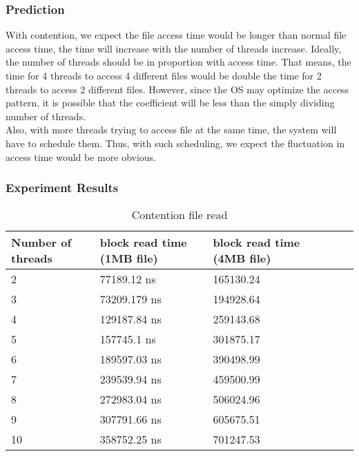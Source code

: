 \documentclass{article} %
\begin{document}
\subsubsection{Prediction}
With contention, we expect the file access time would be longer than normal file access time, the time will increase with the number of threads increase. Ideally, the number of threads should be in proportion with access time. That means, the time for 4 threads to access 4 different files would be double the time for 2 threads to access 2 different files. However, since the OS may optimize the access pattern, it is possible that the coefficient will be less than the simply dividing number of threads. \\
Also, with more threads trying to access file at the same time, the system will have to schedule them. Thus, with such scheduling, we expect the fluctuation in access time would be more obvious.\\

\subsubsection{Experiment Results}
\begin{table}[!htbp]
  \caption{Contention file read}
  \begin{tabular}{|l|l|l|l|l|l|}
    \hline
    Number of threads & block read time (1MB file) & block read time (4MB file) \\ \hline
    2                 & 77189.12 ns                & 165130.24                  \\ \hline
    3                 & 73209.179 ns               & 194928.64                  \\ \hline
    4                 & 129187.84 ns               & 259143.68                  \\ \hline
    5                 & 157745.1  ns               & 301875.17                  \\ \hline
    6                 & 189597.03 ns               & 390498.99                  \\ \hline
    7                 & 239539.94 ns               & 459500.99                  \\ \hline
    8                 & 272983.04 ns               & 506024.96                  \\ \hline
    9                 & 307791.66 ns               & 605675.51                  \\ \hline
    10                & 358752.25 ns               & 701247.53                  \\ \hline
  \end{tabular}
  \label{table:contention_file_read}
\end{table}
\end{document}
